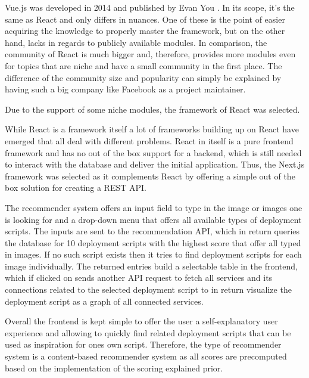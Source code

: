Vue.js was developed in 2014 and published by Evan You \cite{vuejs}. In its scope, it's the same as React and only differs in nuances. One of these is the point of easier acquiring the knowledge to properly master the framework, but on the other hand, lacks in regards to publicly available modules. In comparison, the community of React is much bigger and, therefore, provides more modules even for topics that are niche and have a small community in the first place. The difference of the community size and popularity can simply be explained by having such a big company like Facebook as a project maintainer.

Due to the support of some niche modules, the framework of React was selected.

While React is a framework itself a lot of frameworks building up on React have emerged that all deal with different problems. React in itself is a pure frontend framework and has no out of the box support for a backend, which is still needed to interact with the database and deliver the initial application. Thus, the Next.js framework was selected as it complements React by offering a simple out of the box solution for creating a REST API.

The recommender system offers an input field to type in the image or images one is looking for and a drop-down menu that offers all available types of deployment scripts. The inputs are sent to the recommendation API, which in return queries the database for 10 deployment scripts with the highest score that offer all typed in images. If no such script exists then it tries to find deployment scripts for each image individually. The returned entries build a selectable table in the frontend, which if clicked on sends another API request to fetch all services and its connections related to the selected deployment script to in return visualize the deployment script as a graph of all connected services.

Overall the frontend is kept simple to offer the user a self-explanatory user experience and allowing to quickly find related deployment scripts that can be used as inspiration for ones own script. Therefore, the type of recommender system is a content-based recommender system as all scores are precomputed based on the implementation of the scoring explained prior.
